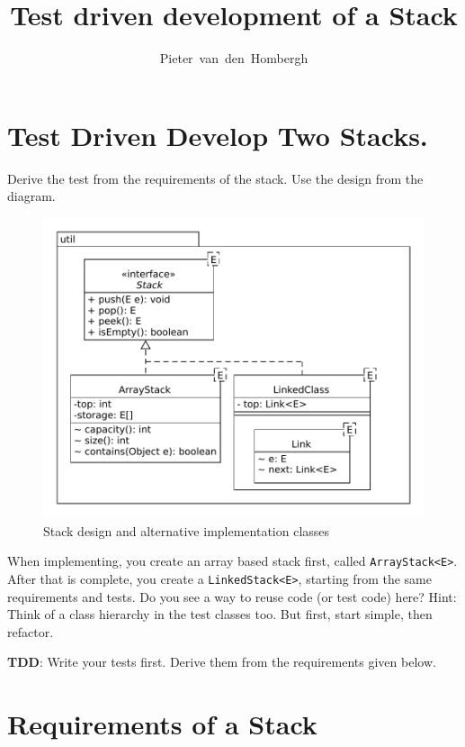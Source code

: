 \documentclass[twocolumn,a4paper]{article}
\author{Pieter~van~den~Hombergh}
\title{Test driven development of a Stack}
\begin{document}
\maketitle

\section*{Test Driven Develop Two Stacks.}

Derive the test from the requirements of the stack.
Use the design from the diagram.
\begin{figure}[htbp]
  \begin{center}
    \includegraphics[width=\linewidth]{figures/twostacks}
    \caption{Stack design and alternative implementation classes}
  \end{center}
\end{figure}
When  implementing,  you create an array based stack first, called
\lstinline{ArrayStack<E>}. After that is complete, you create a
\lstinline{LinkedStack<E>}, starting from the same requirements and tests. Do you see a way to reuse code
(or test code) here? Hint: Think of a class hierarchy in the test
classes too. But first, start simple, then refactor.

\textbf{TDD}: Write your tests first. Derive them from the requirements given below.

\section*{Requirements of a Stack}
\end{document}
